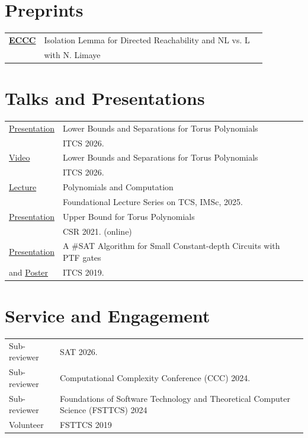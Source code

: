 \documentclass[a4paper,10pt]{article}
\begin{document}
\section{Preprints}

\begin{tabular}{p{2.5cm}|p{11cm}l}
  \href{https://eccc.weizmann.ac.il/report/2016/155/}{{\bf ECCC}} & Isolation Lemma for Directed Reachability and NL vs. L
  \\
  & with N. Limaye
\end{tabular}

\section{Talks and Presentations}

\begin{tabular}{p{2.5cm}|p{11cm}l}
  \href{https://vaibhkrishan.github.io/files/slides/toruslb.pdf}{Presentation} & Lower Bounds and Separations for Torus Polynomials \\
  & ITCS 2026. \\
  \href{https://youtu.be/lJ5oofcZKhQ}{Video} & Lower Bounds and Separations for Torus Polynomials \\
  & ITCS 2026. \\
  \href{https://www.youtube.com/watch?v=SQCH5v0yytw}{Lecture} & Polynomials and Computation \\
                                                              & Foundational Lecture Series on TCS, IMSc, 2025. \\
  \href{https://vaibhkrishan.github.io/files/slides/torus.pdf}{Presentation} & Upper Bound for Torus Polynomials \\
  & CSR 2021. (online) \\
  \href{https://vaibhkrishan.github.io/files/slides/ptf.pdf}{Presentation} & A \#SAT Algorithm for Small Constant-depth Circuits with PTF gates \\
  and \href{https://vaibhkrishan.github.io/files/slides/poster.pdf}{Poster} & ITCS 2019.
\end{tabular}

\section{Service and Engagement}
\begin{tabular}{p{2.5cm}|p{11cm}l}
  Sub-reviewer & SAT 2026. \\
  Sub-reviewer & Computational Complexity Conference (CCC) 2024. \\
  Sub-reviewer & Foundations of Software Technology and Theoretical Computer Science (FSTTCS) 2024 \\
  Volunteer & FSTTCS 2019
\end{tabular}
\end{document}
